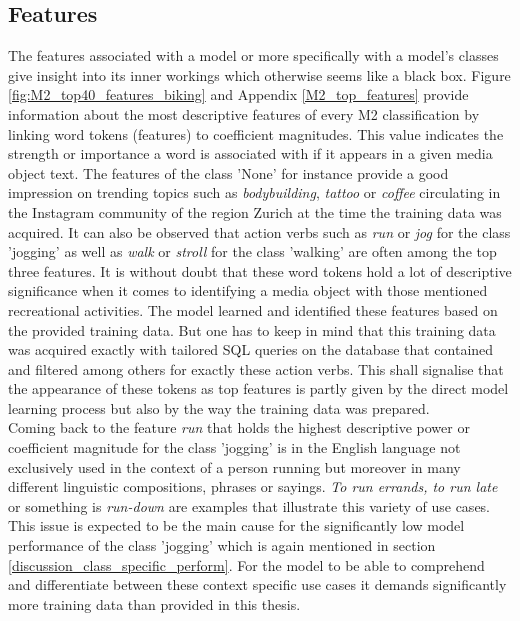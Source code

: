 \subsection{Features} \label{discussion_model_features}
The features associated with a model or more specifically with a model's classes give insight into its inner workings which otherwise seems like a black box. Figure \ref{fig:M2_top40_features_biking} and Appendix \ref{M2_top_features} provide information about the most descriptive features of every M2 classification by linking word tokens (features) to coefficient magnitudes. This value indicates the strength or importance a word is associated with if it appears in a given media object text. The features of the class 'None' for instance provide a good impression on trending topics such as \textit{bodybuilding}, \textit{tattoo} or \textit{coffee} circulating in the Instagram community of the region Zurich at the time the training data was acquired. It can also be observed that action verbs such as \textit{run} or \textit{jog} for the class 'jogging' as well as \textit{walk} or \textit{stroll} for the class 'walking' are often among the top three features. It is without doubt that these word tokens hold a lot of descriptive significance when it comes to identifying a media object with those mentioned recreational activities. The model learned and identified these features based on the provided training data. But one has to keep in mind that this training data was acquired exactly with tailored SQL queries on the database that contained and filtered among others for exactly these action verbs. This shall signalise that the appearance of these tokens as top features is partly given by the direct model learning process but also by the way the training data was prepared. \\ 

Coming back to the feature \textit{run} that holds the highest descriptive power or coefficient magnitude for the class 'jogging' is in the English language not exclusively used in the context of a person running but moreover in many different linguistic compositions, phrases or sayings. \textit{To run errands, to run late} or something is \textit{run-down} are examples that illustrate this variety of use cases. This issue is expected to be the main cause for the significantly low model performance of the class 'jogging' which is again mentioned in section \ref{discussion_class_specific_perform}. For the model to be able to comprehend and differentiate between these context specific use cases it demands significantly more training data than provided in this thesis. 

